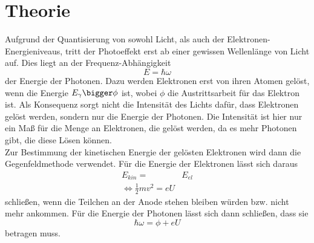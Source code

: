\section{Theorie}
\label{sec:Theorie}

Aufgrund der Quantisierung von sowohl Licht, als auch der Elektronen-Energieniveaus, tritt der Photoeffekt
erst ab einer gewissen Wellenlänge von Licht auf. Dies liegt an der Frequenz-Abhängigkeit
\begin{equation}
    E=\hbar \omega
    \label{eqn:photon}
\end{equation}
der Energie der Photonen. Dazu werden Elektronen erst von ihren Atomen gelöst, wenn die Energie $E_\gamma \bigger \phi$
ist, wobei $\phi$ die Austrittsarbeit für das Elektron ist. Als Konsequenz sorgt nicht die Intensität des Lichts dafür,
dass Elektronen gelöst werden, sondern nur die Energie der Photonen. Die Intensität ist hier nur ein Maß für die Menge
an Elektronen, die gelöst werden, da es mehr Photonen gibt, die diese Lösen können. \\
Zur Bestimmung der kinetischen Energie der gelösten Elektronen wird dann die Gegenfeldmethode verwendet. Für die Energie 
der Elektronen lässt sich daraus
\begin{align}
    E_{kin}=&E_{el}\\
    \iff \frac{1}{2}mv^2=eU
    \label{eqn:ekin}
\end{align}
schließen, wenn die Teilchen an der Anode stehen bleiben würden bzw. nicht mehr ankommen.
Für die Energie der Photonen lässt sich dann schließen, dass sie
\begin{equation}
    \hbar \omega=\phi+eU
    \label{eqn:hquer}
\end{equation}
betragen muss. 
\cite{sample}
